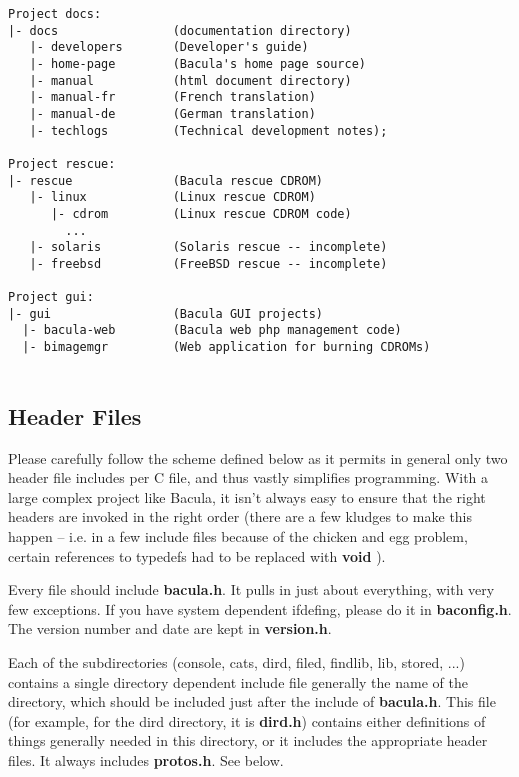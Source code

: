 \begin{verbatim}
Project docs:
|- docs                (documentation directory)
   |- developers       (Developer's guide)
   |- home-page        (Bacula's home page source)
   |- manual           (html document directory)
   |- manual-fr        (French translation)
   |- manual-de        (German translation)
   |- techlogs         (Technical development notes);

Project rescue:
|- rescue              (Bacula rescue CDROM)
   |- linux            (Linux rescue CDROM)
      |- cdrom         (Linux rescue CDROM code)
        ...
   |- solaris          (Solaris rescue -- incomplete)
   |- freebsd          (FreeBSD rescue -- incomplete)

Project gui:
|- gui                 (Bacula GUI projects)
  |- bacula-web        (Bacula web php management code)
  |- bimagemgr         (Web application for burning CDROMs)


\end{verbatim}
\normalsize

\subsection{Header Files}

Please carefully follow the scheme defined below as it permits in general only
two header file includes per C file, and thus vastly simplifies programming.
With a large complex project like Bacula, it isn't always easy to ensure that
the right headers are invoked in the right order (there are a few kludges to
make this happen -- i.e. in a few include files because of the chicken and egg
problem, certain references to typedefs had to be replaced with {\bf void} ).

Every file should include {\bf bacula.h}. It pulls in just about everything,
with very few exceptions. If you have system dependent ifdefing, please do it
in {\bf baconfig.h}. The version number and date are kept in {\bf version.h}.

Each of the subdirectories (console, cats, dird, filed, findlib, lib, stored,
...) contains a single directory dependent include file generally the name of
the directory, which should be included just after the include of {\bf
bacula.h}. This file (for example, for the dird directory, it is {\bf dird.h})
contains either definitions of things generally needed in this directory, or
it includes the appropriate header files. It always includes {\bf protos.h}.
See below.

